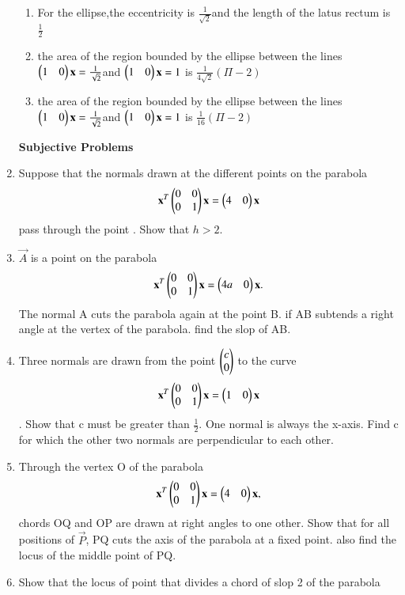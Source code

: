 \begin{enumerate}[label=\arabic*.,ref=\thesubsection.\theenumi]
\begin{enumerate}
    \item For the ellipse,the eccentricity is $\frac{1}{\sqrt{2}}$and the length of the latus rectum 		is $\frac{1}{2}$
    \item the area of the region bounded by the ellipse between the lines $\begin{pmatrix}1&0\end{pmatrix}\mathbf {x}=				\frac{1}{\sqrt{2}}$and $\begin{pmatrix}1&0\end{pmatrix}\mathbf{x}=1$ is $\frac{1}{4\sqrt{2}}(\Pi-2)$
    \item the area of the region bounded by the ellipse between the lines $\begin{pmatrix}1&0\end{pmatrix}\mathbf {x}=				\frac{1}{\sqrt{2}}$and $\begin{pmatrix}1&0\end{pmatrix}\mathbf{x}=1$ is $\frac{1}{16}(\Pi-2)$
    \end{enumerate}
    \textbf{Subjective Problems}
    \item Suppose that the normals drawn at the different points on the parabola
    \begin{align} 
    \mathbf{x}^T\begin{pmatrix}0&0\\0&1\end{pmatrix}\mathbf{x}=\begin{pmatrix}4&0\end{pmatrix}\mathbf{x}
    \end{align} pass through the point . Show that $h>2$.
    \item $\vec{A}$ is a point on the parabola 
    \begin{align}
    \mathbf{x}^T\begin{pmatrix}0&0\\0&1\end{pmatrix}\mathbf{x}=\begin{pmatrix}4a&0\end{pmatrix}\mathbf{x}.
    \end{align} The normal A cuts the parabola again at the point B. if AB subtends a right angle at 		the vertex of the parabola. find the slop of AB.
    \item Three normals are drawn from the point $\begin{pmatrix}c\\0\end{pmatrix}$ to the curve
    \begin{align}
    \mathbf{x}^T\begin{pmatrix}0&0\\0&1\end{pmatrix}\mathbf{x}=\begin{pmatrix}1&0\end{pmatrix}\mathbf{x}
    \end{align}. Show that c must be greater than $\frac{1}{2}$. One normal is always the x-axis. 			Find c for which the other two normals are perpendicular to each other.
    \item Through the vertex O of the parabola 
    \begin{align}
    \mathbf{x}^T\begin{pmatrix}0&0\\0&1\end{pmatrix}\mathbf{x}=\begin{pmatrix}4&0\end{pmatrix}\mathbf{x},
    \end{align} chords OQ and OP are drawn at right angles to one other. Show that for all positions of $\vec{P}$, PQ cuts the axis of the parabola at a fixed point. also find the locus of the middle point of PQ.
    \item Show that the locus of point that divides a chord of slop 2 of the parabola

\end{enumerate}
